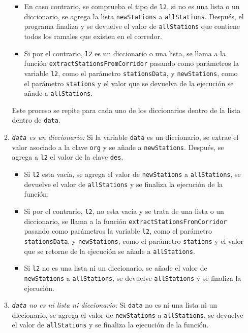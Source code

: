 \begin{enumerate}
\begin{enumerate}
\begin{itemize}
                        \item  En caso contrario, se comprueba el tipo de \texttt{l2}, si no es una lista o un diccionario, se agrega la lista \texttt{newStations} a \texttt{allStations}. Después, el programa finaliza y se devuelve el valor de \texttt{allStations} que contiene todos los ramales que existen en el corredor.
                        
                        \item Si por el contrario, \texttt{l2} es un diccionario o una lista, se llama a la función \texttt{extractStationsFromCorridor} pasando como parámetros la variable \texttt{l2}, como el parámetro \texttt{stationsData}, y \texttt{newStations}, como el parámetro \texttt{stations} y el valor que se devuelva de la ejecución se añade a \texttt{allStations}.
                    \end{itemize}
                Este proceso se repite para cada uno de los diccionarios dentro de la lista dentro de \texttt{data}.
                
                \item \textit{\texttt{data} es un diccionario:} Si la variable \texttt{data} es un diccionario, se extrae el valor asociado a la clave \texttt{org} y se añade a \texttt{newStations}. Después, se agrega a \texttt{l2} el valor de la clave \texttt{des}. 
                    \begin{itemize}
                        \item Si \texttt{l2} esta vacía, se agrega el valor de \texttt{newStations} a \texttt{allStations}, se devuelve el valor de \texttt{allStations} y se finaliza la ejecución de la función. 
                        
                        \item Si por el contrario, \texttt{l2}, no esta vacía y se trata de una lista o un diccionario, se llama a la función \texttt{extractStationsFromCorridor} pasando como parámetros la variable \texttt{l2}, como el parámetro \texttt{stationsData}, y \texttt{newStations}, como el parámetro \texttt{stations} y el valor que se retorne de la ejecución se añade a \texttt{allStations}.
                        
                        \item  Si \texttt{l2} no es una lista ni un diccionario, se añade el valor de \texttt{newStations} a \texttt{allStations}, se devuelve \texttt{allStations} y se finaliza la ejecución.
                    \end{itemize}
                    
                \item \textit{\texttt{data} no es ni lista ni diccionario:} Si \texttt{data} no es ni una lista ni un diccionario, se agrega el valor de \texttt{newStations} a \texttt{allStations}, se devuelve el valor de \texttt{allStations} y se finaliza la ejecución de la función.
            \end{enumerate}
    \end{enumerate}

